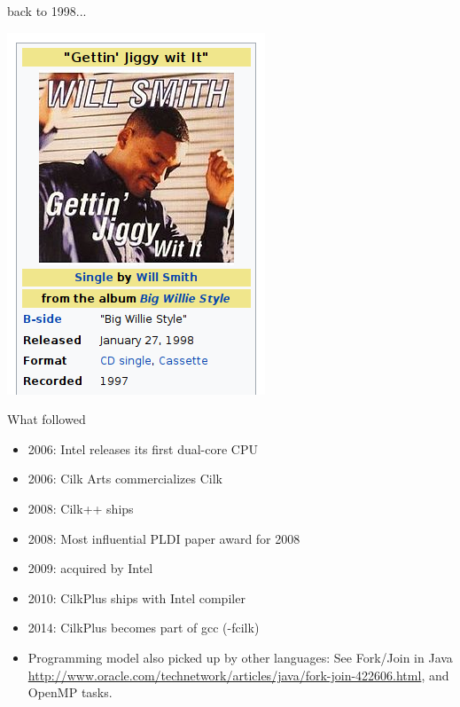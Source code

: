 \documentclass[13pt]{beamer}
\begin{document}
\begin{frame}{back to 1998...}{}
\begin{center}
\includegraphics[width=.4\textwidth]{figs/jiggy}
\end{center}
\end{frame}

\begin{frame}{What followed}{}
  \begin{itemize}
      \item 2006: Intel releases its first dual-core CPU
      \item 2006: Cilk Arts commercializes Cilk
      \item 2008: Cilk++ ships
      \item 2008: Most influential PLDI paper award for 2008
      \item 2009: acquired by Intel
      \item 2010: CilkPlus ships with Intel compiler
      \item 2014: CilkPlus becomes part of gcc ({\ttfamily-fcilk})

      \bigskip
      \item Programming model also picked up by other languages: See Fork/Join
      in Java {\footnotesize
      \url{http://www.oracle.com/technetwork/articles/java/fork-join-422606.html}},
      and OpenMP tasks.
  \end{itemize}
\end{frame}
\end{document}
